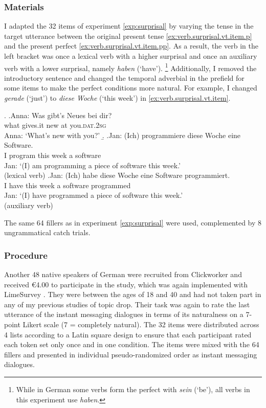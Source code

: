 \subsubsection{Materials}
I adapted the 32 items of experiment \ref*{exp:surprisal} by varying the tense in the target utterance between the original present tense \ref{ex:verb.surprisal.vt.item.p} and the present perfect \ref{ex:verb.surprisal.vt.item.pp}.
As a result, the verb in the left bracket was once a lexical verb with a higher surprisal and once an auxiliary verb with a lower surprisal, namely \textit{haben} (`have').%
\footnote{While in German some verbs form the perfect with \textit{sein} (`be'), all verbs in this experiment use \textit{haben}.}
%
Additionally, I removed the introductory sentence and changed the temporal adverbial in the prefield for some items to make the perfect conditions more natural.
For example, I changed \textit{gerade} (`just') to \textit{diese Woche} (`this week') in \ref{ex:verb.surprisal.vt.item}.

\ex.\label{ex:verb.surprisal.vt.item}
\ag.\label{ex:verb.surprisal.vt.item.question}Anna: Was gibt's Neues bei dir?\\
{} what gives.it new at you.\textsc{dat.2sg}\\
Anna: `What's new with you?'
\b.
\ag.\label{ex:verb.surprisal.vt.item.p}Jan: (Ich) programmiere diese Woche eine Software.\\
{} I program this week a software\\
Jan: `(I) am programming a piece of software this week.'\\\phantom{.}\hfill(lexical verb)
\bg.\label{ex:verb.surprisal.vt.item.pp}Jan: (Ich) habe diese Woche eine Software programmiert.\\
{} I have this week a software programmed\\
Jan: `(I) have programmed a piece of software this week.'\\\phantom{.}\hfill(auxiliary verb)

The same 64 fillers as in experiment \ref*{exp:surprisal} were used, complemented by 8 ungrammatical catch trials.

\subsubsection{Procedure}
Another 48 native speakers of German  were recruited from Clickworker  \citep{clickworker2022} and received €4.00 to participate in the study, which was again implemented with LimeSurvey \citep{limesurveygmbh}.
They were between the ages of 18 and 40 and had not taken part in any of my previous studies of topic drop.
Their task was again to rate the last utterance of the instant messaging dialogues in terms of its naturalness on a 7-point Likert scale (7 = completely natural).
The 32 items were distributed across 4 lists according to a Latin square design to ensure that each participant rated each token set only once and in one condition.
The items were mixed with the 64 fillers and presented in individual pseudo-randomized order as instant messaging dialogues.

